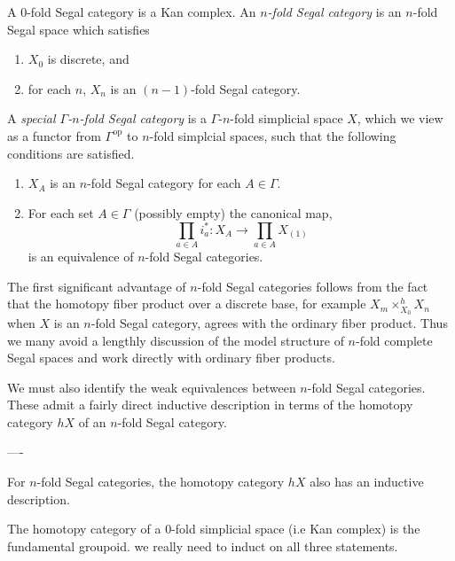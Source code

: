 \documentclass{amsart}
\begin{document}
\begin{definition}
	A $0$-fold Segal category is a Kan complex. An {\em $n$-fold Segal category} is an $n$-fold Segal space which satisfies
	\begin{enumerate}
		\item $X_0$ is discrete, and
		\item for each $n$, $X_n$ is an $(n-1)$-fold Segal category. 
	\end{enumerate}
	A {\em special $\Gamma$-$n$-fold Segal category} is a $\Gamma$-$n$-fold simplicial space $X$, which we view as a functor from $\Gamma^\textrm{op}$ to $n$-fold simplcial spaces, such that the following conditions are satisfied. 
	\begin{enumerate}
		\item $X_A$ is an $n$-fold Segal category for each $A \in \Gamma$. 
		\item For each set $A \in \Gamma$ (possibly empty) the canonical map,
		\begin{equation*}
			\prod_{a \in A} i_a^*: X_A \to \prod_{a \in A} X_{(1)}
		\end{equation*}
		is an equivalence of $n$-fold Segal categories. 
	\end{enumerate}
\end{definition}

The first significant advantage of $n$-fold Segal categories follows from the fact that the homotopy fiber product over a discrete base, for example $X_m \times_{X_0}^h X_n$ when $X$ is an $n$-fold Segal category, agrees with the ordinary fiber product. Thus we many avoid a lengthly discussion of the model structure of $n$-fold complete Segal spaces and work directly with ordinary fiber products.

We must also identify the weak equivalences between $n$-fold Segal categories. These admit a fairly direct inductive description in terms of the homotopy category $hX$ of an $n$-fold Segal category.

----

 For $n$-fold Segal categories, the homotopy category $hX$ also has an inductive description. 

The homotopy category of a $0$-fold simplicial space (i.e Kan complex) is the fundamental groupoid.
 we really need to induct on all three statements. 
\end{document}
